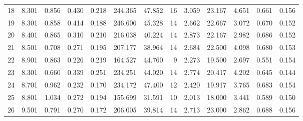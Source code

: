 \begin{tabular}{rrrrrrrrrrrrr}
18 & 8.301 & 0.856 & 0.430 & 0.218 & 244.365 & 47.852 & 16 & 3.059 & 23.167 & 4.651 & 0.661 & 0.156 \\
19 & 8.301 & 0.858 & 0.414 & 0.188 & 246.606 & 45.328 & 14 & 2.662 & 22.667 & 3.072 & 0.670 & 0.152 \\
20 & 8.401 & 0.865 & 0.310 & 0.210 & 216.038 & 40.224 & 14 & 2.873 & 22.167 & 2.982 & 0.686 & 0.152 \\
21 & 8.501 & 0.708 & 0.271 & 0.195 & 207.177 & 38.964 & 14 & 2.684 & 22.500 & 4.098 & 0.680 & 0.153 \\
22 & 8.901 & 0.863 & 0.226 & 0.219 & 164.527 & 44.760 & 9 & 2.273 & 19.500 & 2.697 & 0.551 & 0.154 \\
23 & 8.301 & 0.660 & 0.339 & 0.251 & 234.251 & 44.020 & 14 & 2.774 & 20.417 & 4.202 & 0.645 & 0.144 \\
24 & 8.701 & 0.962 & 0.232 & 0.170 & 234.172 & 47.400 & 12 & 2.420 & 19.917 & 3.765 & 0.683 & 0.154 \\
25 & 8.801 & 1.034 & 0.272 & 0.194 & 155.699 & 31.591 & 10 & 2.013 & 18.000 & 3.441 & 0.589 & 0.150 \\
26 & 9.501 & 0.791 & 0.270 & 0.172 & 206.005 & 39.814 & 14 & 2.713 & 23.000 & 2.862 & 0.688 & 0.156 \\
\end{tabular}

